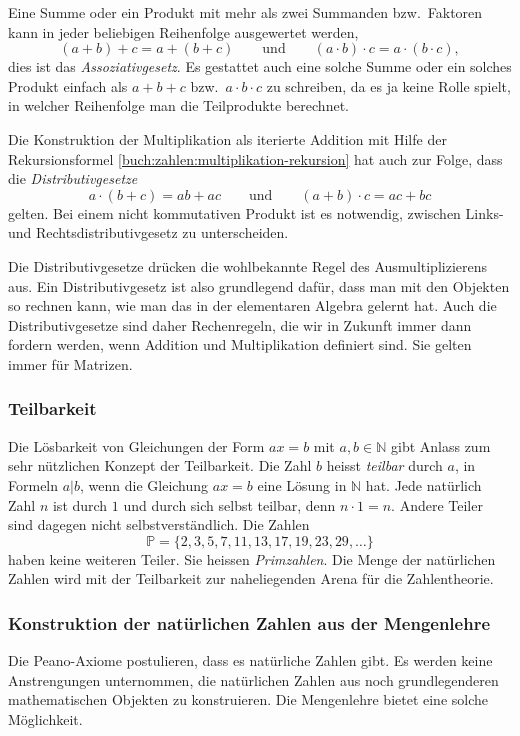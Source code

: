 Eine Summe oder ein Produkt mit mehr als zwei Summanden bzw.~Faktoren
kann in jeder beliebigen Reihenfolge ausgewertet werden,
\[
(a+b)+c
=
a+(b+c)
\qquad\text{und}\qquad
(a\cdot b)\cdot c
=
a\cdot (b\cdot c),
\]
dies ist das {\em Assoziativgesetz}.
Es gestattet auch eine solche Summe oder ein solches Produkt einfach
als $a+b+c$ bzw.~$a\cdot b\cdot c$ zu schreiben, da es ja keine Rolle
spielt, in welcher Reihenfolge man die Teilprodukte berechnet.

Die Konstruktion der Multiplikation als iterierte Addition mit Hilfe
der Rekursionsformel \eqref{buch:zahlen:multiplikation-rekursion}
hat auch zur Folge, dass die {\em Distributivgesetze}
%
\[
a\cdot(b+c) = ab+ac
\qquad\text{und}\qquad
(a+b)\cdot c = ac+bc
\]
gelten.
Bei einem nicht kommutativen Produkt ist es notwendig,
zwischen Links- und Rechtsdistributivgesetz zu unterscheiden.

Die Distributivgesetze drücken die wohlbekannte Regel des
Ausmultiplizierens aus.
Ein Distributivgesetz ist also grundlegend dafür, dass man mit den
Objekten so rechnen kann, wie man das in der elementaren Algebra 
gelernt hat.
Auch die Distributivgesetze sind daher Rechenregeln, die wir in
Zukunft immer dann fordern werden, wenn Addition und Multiplikation
definiert sind.
Sie gelten immer für Matrizen.

\subsubsection{Teilbarkeit}
Die Lösbarkeit von Gleichungen der Form $ax=b$ mit $a,b\in\mathbb{N}$
gibt Anlass zum sehr nützlichen Konzept der Teilbarkeit.
%
Die Zahl $b$ heisst {\em teilbar} durch $a$, in Formeln $a|b$,
wenn die Gleichung $ax=b$ eine Lösung in $\mathbb{N}$ hat.
%
Jede natürlich Zahl $n$ ist durch $1$ und durch sich selbst teilbar,
denn $n\cdot 1 = n$.
Andere Teiler sind dagegen nicht selbstverständlich.
Die Zahlen
\[
\mathbb{P}
=
\{2,3,5,7,11,13,17,19,23,29,\dots\}
\]
haben keine weiteren Teiler. Sie heissen {\em Primzahlen}.
%
Die Menge der natürlichen Zahlen wird mit der Teilbarkeit zur naheliegenden
Arena für die Zahlentheorie.
%

\subsubsection{Konstruktion der natürlichen Zahlen aus der Mengenlehre}
Die Peano-Axiome postulieren, dass es natürliche Zahlen gibt.
Es werden keine Anstrengungen unternommen, die natürlichen Zahlen
aus noch grundlegenderen mathematischen Objekten zu konstruieren.
Die Mengenlehre bietet eine solche Möglichkeit.

